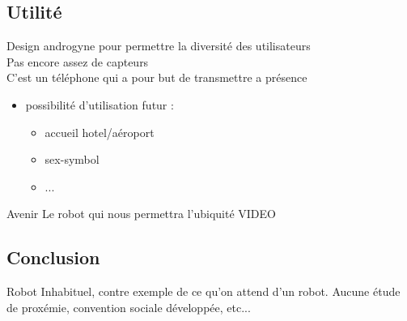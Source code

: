 \documentclass{beamer}
\begin{document}
\subsection{Utilité}
\begin{frame}
Design androgyne pour permettre la diversité des utilisateurs
\\
Pas encore assez de capteurs
\\
C'est un téléphone qui a pour but de transmettre a présence
\\
  \begin{itemize}
  \item possibilité d'utilisation futur :
	  \begin{itemize}
	  \item accueil hotel/aéroport
	  \item sex-symbol
	  \item ...
	  \end{itemize}
  \end{itemize}
\end{frame}

\begin{frame}{Avenir}
  Le robot qui nous permettra l'ubiquité
\vspace{0.5cm}  
VIDEO
\end{frame}

\subsection{Conclusion}
\begin{frame}
  Robot Inhabituel, contre exemple de ce qu'on attend d'un robot.
  Aucune étude de proxémie, convention sociale développée, etc...
\end{frame}
\end{document}
